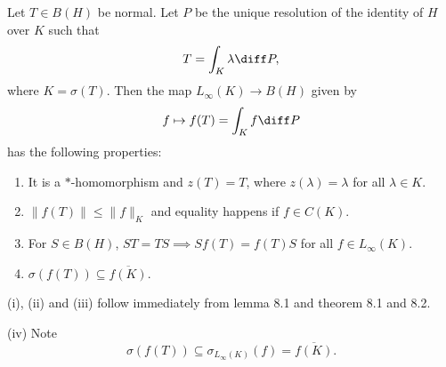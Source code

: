 \documentclass[12pt]{article}
\begin{document}
\begin{theorem}
	Let $T \in B(H)$ be normal. Let $P$ be the unique resolution of the identity of $H$ over $K$ such that
	\[
	T = \int_K \lambda \diff P,
	\]
	where $K = \sigma(T)$. Then the map $L_\infty(K) \to B(H)$ given by
	\[
	f \mapsto f(T) = \int_K f \diff P
	\]
	has the following properties:
	\begin{enumerate}[\normalfont(i)]
		\item It is a $\ast$-homomorphism and $z(T) = T$, where $z(\lambda) = \lambda$ for all $\lambda \in K$.
		\item $\|f(T)\| \leq \|f\|_K$ and equality happens if $f \in C(K)$.
		\item For $S \in B(H)$, $ST = TS \implies S f(T) = f(T) S$ for all $f \in L_\infty(K)$.
		\item $\sigma(f(T)) \subseteq \overline{f(K)}$.
	\end{enumerate}
\end{theorem}

\begin{proofbox}


	(i), (ii) and (iii) follow immediately from lemma 8.1 and theorem 8.1 and 8.2.

	(iv) Note
	\[
	\sigma(f(T)) \subseteq \sigma_{L_\infty(K)}(f) = \overline{f(K)}.
	\]
\end{proofbox}


\newpage

\printindex
\end{document}
